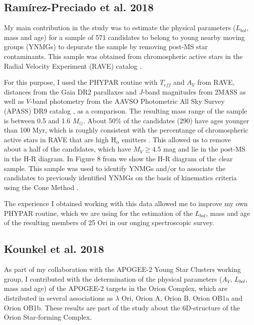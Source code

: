 \documentclass[12pt]{article}
\begin{document}
\subsection{Ram\'irez-Preciado et al. 2018}
\label{sec:Ramirez-Preciado}
My main contribution in the \cite{Ramirez-Preciado2018} study was to estimate the physical parameters ($L_{bol}$, mass and age) for a sample of 571 candidates to belong to young nearby moving groups (YNMGs) to depurate the sample by removing post-MS star contaminants. This sample was obtained from chromospheric active stars in the Radial Velocity Experiment (RAVE) catalog \citep{Kunder2017}.

For this purpose, I used the PHYPAR routine with $T_{eff}$ and $A_V$ from RAVE, distances from the Gaia DR2 parallaxes and $J$-band magnitudes from 2MASS as well as $V$-band photometry from the AAVSO Photometric All Sky Survey (APASS) DR9 catalog \citep{Henden2016}, as a comparison. The resulting mass range of the sample is between 0.5 and 1.6 $M_\odot$. About 50\% of the candidates (290) have ages younger than 100 Myr, which is roughly consistent with the percentange of chromospheric active stars in RAVE that are high H$_\alpha$ emitters \citep{Zerjal2013}. This allowed us to remove about a half of the candidates, which have $M_V\ge4.5$ mag and lie in the post-MS in the H-R diagram. In Figure 8 from \citet{Ramirez-Preciado2018} we show the H-R diagram of the clear sample. This sample was used to identify YNMGs and/or to associate the candidates to previously identified YNMGs on the basis of kinematics criteria using the Cone Method \citep{Ramirez-Preciado2018}.

The experience I obtained working with this data allowed me to improve my own PHYPAR routine, which we are using for the estimation of the $L_{bol}$, mass and age of the resulting members of 25 Ori in our onging spectroscopic survey.

\subsection{Kounkel et al. 2018}
\label{sec:Kounkel}
As part of my collaboration with the APOGEE-2 Young Star Clusters working group, I contributed with the determination of the physical parameters ($A_V$, $L_{bol}$, mass and age) of the APOGEE-2 targets in the Orion Complex, which are distributed in several associations as $\lambda$ Ori, Orion A, Orion B, Orion OB1a and Orion OB1b. These results are part of the \citet{Kounkel2018} study about the 6D-structure of the Orion Star-forming Complex.
\end{document}
